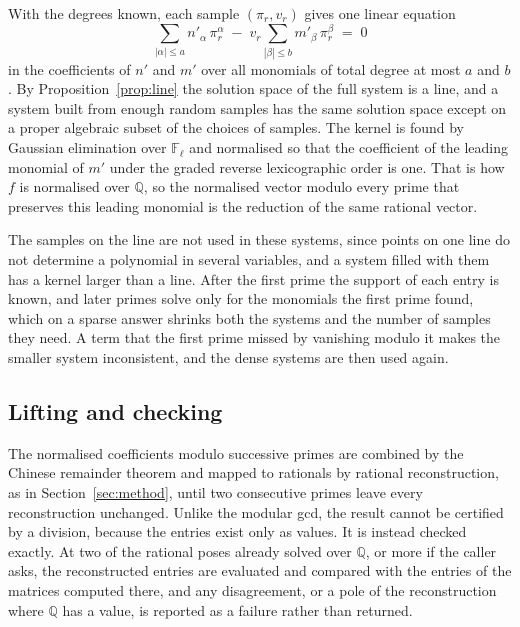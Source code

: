 \documentclass[11pt,a4paper]{article}
\theoremstyle{plain}
\theoremstyle{definition}
\theoremstyle{remark}
\newcommand{\FF}{\mathbb{F}}
\newcommand{\QQ}{\mathbb{Q}}
\begin{document}
With the degrees known, each sample $(\pi_r, v_r)$ gives one linear equation
\[
  \sum_{|\alpha| \le a} n'_\alpha\, \pi_r^\alpha \;-\; v_r \sum_{|\beta| \le b} m'_\beta\, \pi_r^\beta \;=\; 0
\]
in the coefficients of $n'$ and $m'$ over all monomials of total degree at most $a$ and $b$. By
Proposition~\ref{prop:line} the solution space of the full system is a line, and a system built from
enough random samples has the same solution space except on a proper algebraic subset of the choices
of samples. The kernel is found by Gaussian elimination over $\FF_\ell$ and normalised so that the
coefficient of the leading monomial of $m'$ under the graded reverse lexicographic order is one. That
is how $f$ is normalised over $\QQ$, so the normalised vector modulo every prime that preserves this
leading monomial is the reduction of the same rational vector.

The samples on the line are not used in these systems, since points on one line do not determine a
polynomial in several variables, and a system filled with them has a kernel larger than a line. After
the first prime the support of each entry is known, and later primes solve only for the monomials the
first prime found, which on a sparse answer shrinks both the systems and the number of samples they
need. A term that the first prime missed by vanishing modulo it makes the smaller system inconsistent,
and the dense systems are then used again.

\subsection{Lifting and checking}

The normalised coefficients modulo successive primes are combined by the Chinese remainder theorem and
mapped to rationals by rational reconstruction, as in Section~\ref{sec:method}, until two consecutive
primes leave every reconstruction unchanged. Unlike the modular gcd, the result cannot be certified
by a division, because the entries exist only as values. It is instead checked exactly. At two of the
rational poses already solved over $\QQ$, or more if the caller asks, the reconstructed entries are
evaluated and compared with the entries of the matrices computed there, and any disagreement, or a
pole of the reconstruction where $\QQ$ has a value, is reported as a failure rather than returned.
\end{document}
